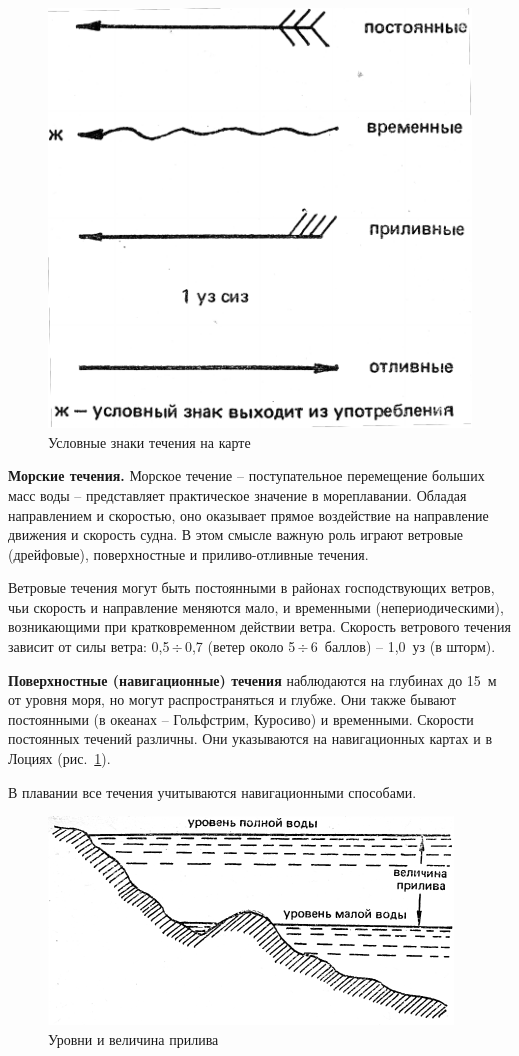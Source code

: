 \documentclass[a4paper, 12pt, twoside, final, book, russian, fittopage, cyremdash]{ncc}
\newcommand{\otdo}{\,\ensuremath{\div}\,}
\newcommand{\ris}[1]{\ref{fig:#1}}
\begin{document}
\begin{figure}[htb]
  \centering{}
  \includegraphics[scale=1.2]{0125P}
  \caption{Условные знаки течения на карте}
  \label{fig:125}
\end{figure}

\textbf{Морские течения.} Морское течение \--- поступательное перемещение больших масс воды \--- представляет практическое значение в мореплавании. Обладая направлением и скоростью, оно оказывает прямое воздействие на направление движения и скорость судна. В этом смысле важную роль играют ветровые (дрейфовые), поверхностные и приливо-отливные течения.

Ветровые течения могут быть постоянными в районах господствующих ветров, чьи скорость и направление меняются мало, и временными (непериодическими), возникающими при кратковременном действии ветра. Скорость ветрового течения зависит от силы ветра: 0,5\otdo 0,7 (ветер около 5\otdo 6~баллов) \--- 1,0~уз (в шторм).

\textbf{Поверхностные (навигационные) течения} наблюдаются на глубинах до 15~м от уровня моря, но могут распространяться и глубже. Они также бывают постоянными (в океанах \--- Гольфстрим, Куросиво) и временными. Скорости постоянных течений различны. Они указываются на навигационных картах и в Лоциях (рис.~\ris{125}).

В плавании все течения учитываются навигационными способами.

\begin{figure}[htb]
  \centering{}
  \includegraphics[scale=1.2]{0126P}
  \caption{Уровни и величина прилива}
  \label{fig:126}
\end{figure}
\end{document}
